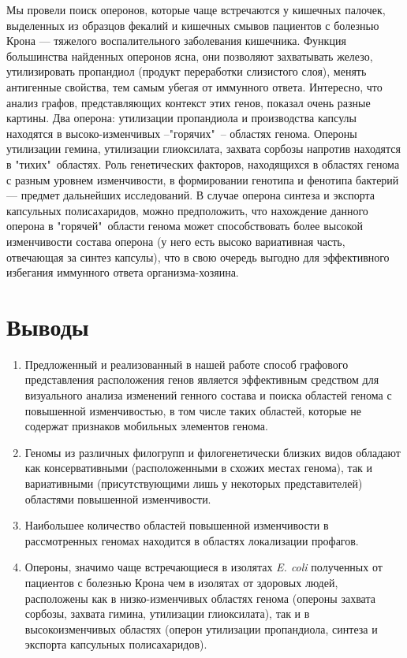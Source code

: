Мы провели поиск оперонов, которые чаще встречаются у кишечных палочек, выделенных из образцов фекалий и кишечных смывов пациентов с болезнью Крона --- тяжелого воспалительного заболевания кишечника. Функция большинства найденных оперонов ясна, они позволяют захватывать железо, утилизировать пропандиол (продукт переработки слизистого слоя), менять антигенные свойства, тем самым убегая от иммунного ответа. Интересно, что анализ графов, представляющих контекст этих генов, показал очень разные картины. Два оперона: утилизации пропандиола и производства капсулы находятся в высоко-изменчивых --"горячих"\ -- областях генома. Опероны утилизации гемина, утилизации глиоксилата, захвата сорбозы напротив находятся в "тихих"\ областях. Роль генетических факторов, находящихся в областях генома с разным уровнем изменчивости, в формировании генотипа и фенотипа бактерий --- предмет дальнейших исследований. В случае оперона синтеза и экспорта капсульных полисахаридов, можно предположить, что нахождение данного оперона в "горячей"\ области генома может способствовать более высокой изменчивости состава оперона (у него есть высоко вариативная часть, отвечающая за синтез капсулы), что в свою очередь выгодно для эффективного избегания иммунного ответа организма-хозяина.

\section*{Выводы} 
\begin{enumerate}
\item Предложенный и реализованный в нашей работе способ графового представления расположения генов является эффективным средством для визуального анализа изменений генного состава и поиска областей генома с повышенной изменчивостью, в том числе таких областей, которые не содержат признаков мобильных элементов генома.

\item Геномы из различных филогрупп и филогенетически близких видов обладают как консервативными (расположенными в схожих местах генома), так и вариативными (присутствующими лишь у некоторых представителей) областями повышенной изменчивости.

\item Наибольшее количество областей повышенной изменчивости в рассмотренных геномах находится в областях локализации профагов.

\item Опероны, значимо чаще встречающиеся в изолятах \textit{E. coli} полученных от пациентов с болезнью Крона чем в изолятах от здоровых людей, расположены как в низко-изменчивых областях генома (опероны захвата сорбозы, захвата гимина, утилизации глиоксилата), так и в высокоизменчивых областях (оперон утилизации пропандиола, синтеза и экспорта капсульных полисахаридов).
\end{enumerate}

